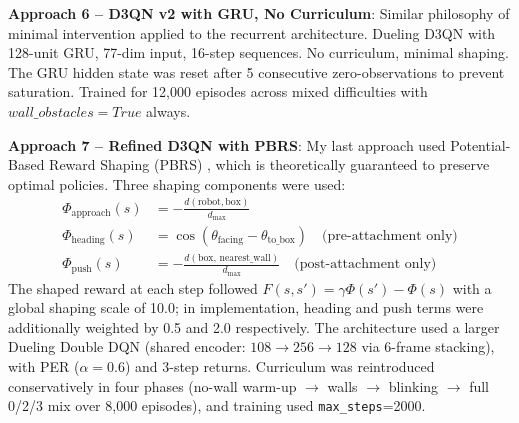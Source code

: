\documentclass[10.5pt, oneside]{article}
\begin{document}
\textbf{Approach 6 -- D3QN v2 with GRU, No Curriculum}: Similar philosophy of minimal intervention applied to the recurrent architecture. Dueling D3QN with 128-unit GRU, 77-dim input, 16-step sequences. No curriculum, minimal shaping. The GRU hidden state was reset after 5 consecutive zero-observations to prevent saturation. Trained for 12,000 episodes across mixed difficulties with $wall\_obstacles=True$ always.

\textbf{Approach 7 -- Refined D3QN with PBRS}: My last approach used Potential-Based Reward Shaping (PBRS) \cite{ng1999policy}, which is theoretically guaranteed to preserve optimal policies. Three shaping components were used:
\begin{align}
    \Phi_{\text{approach}}(s) &= -\frac{d(\text{robot},\text{box})}{d_{\text{max}}} \\
    \Phi_{\text{heading}}(s) &= \cos(\theta_{\text{facing}} - \theta_{\text{to\_box}}) \quad \text{(pre-attachment only)} \\
    \Phi_{\text{push}}(s) &= -\frac{d(\text{box, nearest\_wall})}{d_{\text{max}}} \quad \text{(post-attachment only)}
\end{align}
The shaped reward at each step followed $F(s, s') = \gamma \Phi(s') - \Phi(s)$ with a global shaping scale of 10.0; in implementation, heading and push terms were additionally weighted by 0.5 and 2.0 respectively. The architecture used a larger Dueling Double DQN (shared encoder: $108 \to 256 \to 128$ via 6-frame stacking), with PER ($\alpha=0.6$) and 3-step returns. Curriculum was reintroduced conservatively in four phases (no-wall warm-up $\to$ walls $\to$ blinking $\to$ full 0/2/3 mix over 8,000 episodes), and training used \texttt{max\_steps}=2000.
\end{document}
